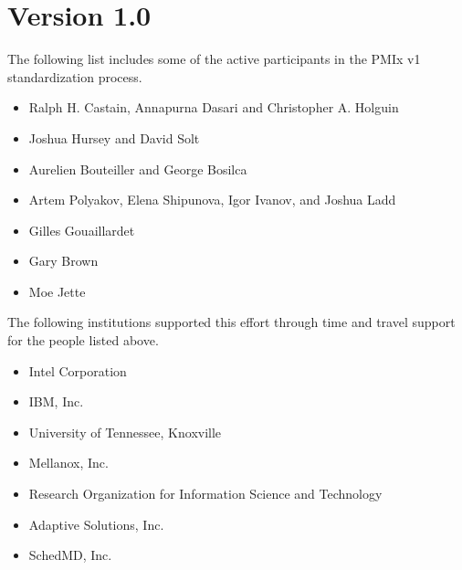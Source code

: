 \section{Version 1.0}

The following list includes some of the active participants in the PMIx v1 standardization process.

\begin{itemize}
\item Ralph H. Castain, Annapurna Dasari and Christopher A. Holguin
\item Joshua Hursey and David Solt
\item Aurelien Bouteiller and George Bosilca
\item Artem Polyakov, Elena Shipunova, Igor Ivanov, and Joshua Ladd
\item Gilles Gouaillardet
\item Gary Brown
\item Moe Jette
\end{itemize}

The following institutions supported this effort through time and travel support for the people listed above.

\begin{itemize}
\item Intel Corporation
\item IBM, Inc.
\item University of Tennessee, Knoxville
\item Mellanox, Inc.
\item Research Organization for Information Science and Technology
\item Adaptive Solutions, Inc.
\item SchedMD, Inc.
\end{itemize}
